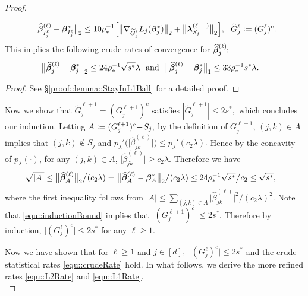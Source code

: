 \documentclass[twoside,11pt]{article}
\newcommand{\defeq}{\vcentcolon=}
\newcommand*{\hbbeta}{\hat{\bbeta}}
\newcommand*{\bbetas}{\bbeta^*}
\newcommand*{\hbbetas}{\hat{\bbeta}_{j}}
\newcommand*{\bbetass}{\bbeta^*_{j}}
\begin{document}
\begin{proof}
\begin{lemma}
\begin{align}
\bigl \| \hbbeta_{I_j^\ell}^{(\ell)} - \bbetas_{I_j^\ell} \bigr\|_2\leq  10 \rho_* ^{-1} \Bigl [\bigl\|\nabla _{\tilde G_j^\ell} L_j(\bbetas_j) \bigr\|_2 + \bigl\|\blambda_{S_j}^{(\ell-1)}\bigr\|_2 \Bigr],~~\tilde G^\ell_j \defeq (G_j^{\ell })^c.
\end{align}
This implies the  following crude rates of convergence for $\hbbeta_j^{(\ell)}\!\!:$
\begin{align}
\bigl \| \hbbetas^{(\ell)} - \bbetass\bigr \|_2 &\leq  24 \rho_*^{-1}\sqrt{s^*} \lambda~~\text{and}~~\bigl \| \hbbetas^{(\ell)} - \bbetass\bigr \|_1 \leq 33 \rho_*^{-1}s^* \lambda . \label{equ::crudeRate}
\end{align}
\end{lemma}

\begin{proof} 
See \S \ref{proof::lemma::StayInL1Ball} for a detailed proof. 
\end{proof}

Now we show that $\tilde G_j^{\ell+1}\!=\! (G_j^{\ell+1})^c$ satisfies $|\tilde G_j^{\ell+1} |\leq 2s^*,$ which concludes our induction.
Letting $A\defeq (G_j^{\ell+1})^c \!-\!S_j,$ by the definition of $G_j^{\ell+1}$, $(j,k) \in A$ implies that  $(j,k)\notin S_j$ and $p_{\lambda}'\bigl(\bigl |\hat \beta_{jk}^{(\ell)} \bigr|\bigr) \leq p_{\lambda}'(c_2\lambda).$ 
Hence by the concavity of $p_{\lambda}(\cdot)$, for any $(j,k)\in A$, $ \bigl|\hat \beta_{jk}^{(\ell)}\bigr | \geq c_2 \lambda.$ 
Therefore we have 
\begin{align}\label{equ::inductionBound}
\sqrt{|A|}& \leq \big\|\hbbeta_{A} ^{(\ell)}\bigr \|_2\big/ (c_2\lambda)  = \big\|\hbbeta_{A} ^{(\ell)} - \bbetas_{A}\big\|_2\big/ (c_2\lambda) \leq 24\rho _*^{-1}\sqrt{s^*} \big/ c_2\leq \sqrt{s^*},
\end{align}
where the first inequality follows from $|A| \leq \sum_{(j,k)\in A} \bigl|\hat \beta_{jk}^{(\ell)}\bigr |^2 \big/(c_2\lambda)^2.$
Note that \eqref{equ::inductionBound}  implies that $\bigl | (G_j^{\ell+1})^c\bigr| \leq 2s^*.$ Therefore by induction, $\bigl|(G_{j}^\ell)^{c}\bigr| \leq 2 s^*$ for any $\ell \geq 1.$

Now we have shown that for $\ell\geq 1$ and $j\in[d],$ $\bigl|(G_j^\ell)^c\bigr|\leq 2s^*$ and the crude statistical rates \eqref{equ::crudeRate} hold. In what follows, we derive the more refined rates \eqref{equ::L2Rate} and \eqref{equ::L1Rate}.\\


\end{proof}
\end{document}
